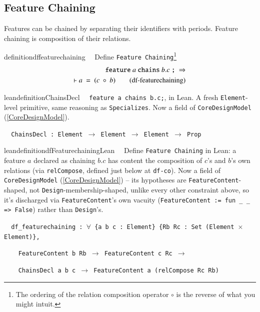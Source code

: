 \subsection{Feature Chaining} 

\pn  Features can be chained by separating their identifiers with periods.  Feature chaining is composition of their relations.

\begin{restatable}{definition}{dffeaturechaining}~~   Define \texttt{Feature Chaining}\footnote{The ordering of the relation composition operator $\circ$ is the reverse of what you might intuit.}
\begin{align}
\texttt{feature}~a~\texttt{chains}~ b.c ~\texttt{;}~\Rightarrow  \notag \\
\vdash a~=~(c~\circ~b)
\label{eq:df-featurechaining}\tag{df-featurechaining}
\end{align}
\end{restatable}

\begin{restatable}{leandefinition}{ChainsDecl}~~ \texttt{feature a chains b.c;}, in Lean. A
fresh \texttt{Element}-level primitive, same reasoning as \texttt{Specializes}. Now a field of
\texttt{CoreDesignModel} (\ref{CoreDesignModel}).

\texttt{~~ChainsDecl : Element $\to$ Element $\to$ Element $\to$ Prop}
\label{ChainsDecl}
\end{restatable}

\begin{restatable}{leandefinition}{dfFeaturechainingLean}~~ Define \texttt{Feature
Chaining} in Lean: a feature $a$ declared as chaining $b.c$ has content the composition of $c$'s and $b$'s own
relations (via \texttt{relCompose}, defined just below at \texttt{df-co}). Now a field of
\texttt{CoreDesignModel} (\ref{CoreDesignModel}) -- its hypotheses are \texttt{FeatureContent}-shaped, not
\texttt{Design}-membership-shaped, unlike every other constraint above, so it's discharged via
\texttt{FeatureContent}'s own vacuity (\texttt{FeatureContent := fun \_ \_ => False}) rather than
\texttt{Design}'s.

\texttt{~~df\_featurechaining : $\forall$ \{a b c : Element\} \{Rb Rc : Set (Element $\times$ Element)\},}

\texttt{~~~~FeatureContent b Rb $\to$ FeatureContent c Rc $\to$}

\texttt{~~~~ChainsDecl a b c $\to$ FeatureContent a (relCompose Rc Rb)}
\label{df_featurechaining}
\end{restatable}


